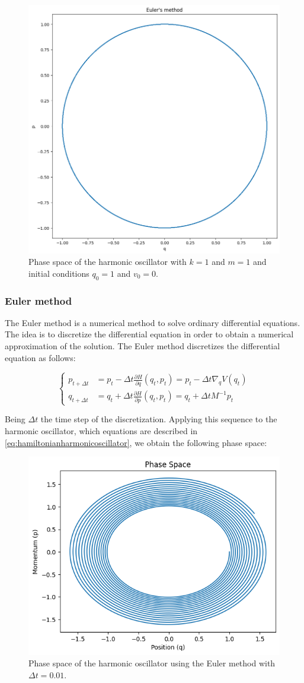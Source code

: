 \documentclass{article}
\begin{document}
\begin{figure}[H]
	\centering
	\includegraphics[width=0.5\linewidth]{./Figures/Sympletic/phaseanalytics.png}
	\caption{Phase space of the harmonic oscillator with \(k = 1\) and \(m = 1\) and initial conditions \(q_0 = 1\) and \(v_0 = 0\).}
	\label{fig:harmonicoscillator}
\end{figure}


\subsubsection{Euler method}
\label{sec:euler_method}

The Euler method is a numerical method to solve ordinary differential equations. The idea is to discretize the differential equation in order to obtain a numerical approximation of the solution. The Euler method discretizes the differential equation as follows:

\begin{equation}
	\begin{cases}
		p_{t+ \Delta t} &= p_t - \Delta t \frac{\partial H}{\partial q}(q_t, p_t) = p_t - \Delta t \nabla_q V(q_t) \\
		q_{t+ \Delta t} &= q_t + \Delta t \frac{\partial H}{\partial p}(q_t, p_t) = q_t + \Delta t M^{-1} p_t
	\end{cases}
	\label{eq:euler}
\end{equation}

Being \(\Delta t\) the time step of the discretization. Applying this sequence to the harmonic oscillator, which equations are described in \eqref{eq:hamiltonianharmonicoscillator}, we obtain the following phase space:

\begin{figure}[H]
	\centering
	\includegraphics[width=0.5\linewidth]{./Figures/Sympletic/eulerphase1.png}
	\caption{Phase space of the harmonic oscillator using the Euler method with \(\Delta t = 0.01\).}
	\label{fig:hamiltonianharmonicoscillator}
\end{figure}
\end{document}
